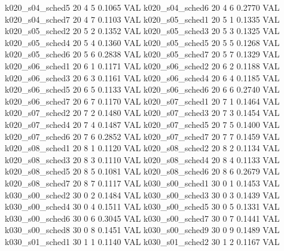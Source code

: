   k020_s04_sched5                   20    4   5    0.1065  VAL
  k020_s04_sched6                   20    4   6    0.2770  VAL
  k020_s04_sched7                   20    4   7    0.1103  VAL
  k020_s05_sched1                   20    5   1    0.1335  VAL
  k020_s05_sched2                   20    5   2    0.1352  VAL
  k020_s05_sched3                   20    5   3    0.1325  VAL
  k020_s05_sched4                   20    5   4    0.1360  VAL
  k020_s05_sched5                   20    5   5    0.1268  VAL
  k020_s05_sched6                   20    5   6    0.2838  VAL
  k020_s05_sched7                   20    5   7    0.1329  VAL
  k020_s06_sched1                   20    6   1    0.1171  VAL
  k020_s06_sched2                   20    6   2    0.1188  VAL
  k020_s06_sched3                   20    6   3    0.1161  VAL
  k020_s06_sched4                   20    6   4    0.1185  VAL
  k020_s06_sched5                   20    6   5    0.1133  VAL
  k020_s06_sched6                   20    6   6    0.2740  VAL
  k020_s06_sched7                   20    6   7    0.1170  VAL
  k020_s07_sched1                   20    7   1    0.1464  VAL
  k020_s07_sched2                   20    7   2    0.1480  VAL
  k020_s07_sched3                   20    7   3    0.1454  VAL
  k020_s07_sched4                   20    7   4    0.1487  VAL
  k020_s07_sched5                   20    7   5    0.1400  VAL
  k020_s07_sched6                   20    7   6    0.2852  VAL
  k020_s07_sched7                   20    7   7    0.1459  VAL
  k020_s08_sched1                   20    8   1    0.1120  VAL
  k020_s08_sched2                   20    8   2    0.1134  VAL
  k020_s08_sched3                   20    8   3    0.1110  VAL
  k020_s08_sched4                   20    8   4    0.1133  VAL
  k020_s08_sched5                   20    8   5    0.1081  VAL
  k020_s08_sched6                   20    8   6    0.2679  VAL
  k020_s08_sched7                   20    8   7    0.1117  VAL
  k030_s00_sched1                   30    0   1    0.1453  VAL
  k030_s00_sched2                   30    0   2    0.1484  VAL
  k030_s00_sched3                   30    0   3    0.1439  VAL
  k030_s00_sched4                   30    0   4    0.1511  VAL
  k030_s00_sched5                   30    0   5    0.1331  VAL
  k030_s00_sched6                   30    0   6    0.3045  VAL
  k030_s00_sched7                   30    0   7    0.1441  VAL
  k030_s00_sched8                   30    0   8    0.1451  VAL
  k030_s00_sched9                   30    0   9    0.1489  VAL
  k030_s01_sched1                   30    1   1    0.1140  VAL
  k030_s01_sched2                   30    1   2    0.1167  VAL
